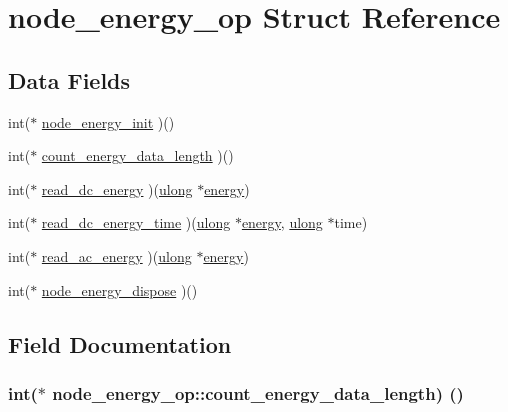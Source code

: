 \hypertarget{structnode__energy__op}{}\section{node\+\_\+energy\+\_\+op Struct Reference}
\label{structnode__energy__op}
\subsection*{Data Fields}
\begin{DoxyCompactItemize}
\item 
int($\ast$ \hyperlink{structnode__energy__op_af8a2499c3c1922ea2541d7a3049fbc76}{node\+\_\+energy\+\_\+init} )()
\item 
int($\ast$ \hyperlink{structnode__energy__op_a70a6738840757dcb6a160757ad2bf13a}{count\+\_\+energy\+\_\+data\+\_\+length} )()
\item 
int($\ast$ \hyperlink{structnode__energy__op_a6a01750b2e3201600fe442f129a4f4e6}{read\+\_\+dc\+\_\+energy} )(\hyperlink{generic_8h_a718b4eb2652c286f4d42dc18a8e71a1a}{ulong} $\ast$\hyperlink{structenergy}{energy})
\item 
int($\ast$ \hyperlink{structnode__energy__op_a7e0bf1be9d7679bbd525b8fc0a72c784}{read\+\_\+dc\+\_\+energy\+\_\+time} )(\hyperlink{generic_8h_a718b4eb2652c286f4d42dc18a8e71a1a}{ulong} $\ast$\hyperlink{structenergy}{energy}, \hyperlink{generic_8h_a718b4eb2652c286f4d42dc18a8e71a1a}{ulong} $\ast$time)
\item 
int($\ast$ \hyperlink{structnode__energy__op_a0f670e83aaaa2010f752c5382c6c0b2d}{read\+\_\+ac\+\_\+energy} )(\hyperlink{generic_8h_a718b4eb2652c286f4d42dc18a8e71a1a}{ulong} $\ast$\hyperlink{structenergy}{energy})
\item 
int($\ast$ \hyperlink{structnode__energy__op_a51401cd5a29801fce94ae88be780394e}{node\+\_\+energy\+\_\+dispose} )()
\end{DoxyCompactItemize}


\subsection{Field Documentation}
\subsubsection[{\texorpdfstring{count\+\_\+energy\+\_\+data\+\_\+length}{count_energy_data_length}}]{\setlength{\rightskip}{0pt plus 5cm}int($\ast$ node\+\_\+energy\+\_\+op\+::count\+\_\+energy\+\_\+data\+\_\+length) ()}\hypertarget{structnode__energy__op_a70a6738840757dcb6a160757ad2bf13a}{}\label{structnode__energy__op_a70a6738840757dcb6a160757ad2bf13a}
